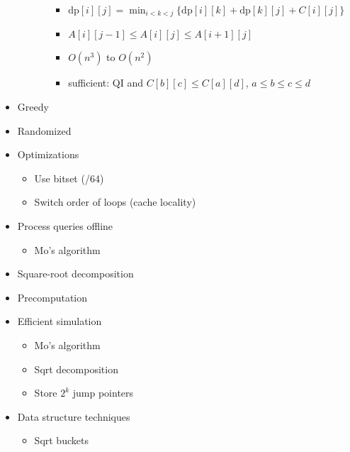 \documentclass[9pt,a4paper,twocolumn,landscape,oneside]{amsart}
\begin{document}
\begin{itemize}
\begin{itemize}
\begin{itemize}
\begin{itemize}
                                        \item $\mathrm{dp}[i][j] = \min_{i<k<j}\{\mathrm{dp}[i][k] + \mathrm{dp}[k][j] + C[i][j]\}$
                                        \item $A[i][j-1] \leq A[i][j] \leq A[i+1][j]$
                                        \item $O(n^3)$ to $O(n^2)$
                                        \item sufficient: QI and $C[b][c] \leq C[a][d]$, $a\leq b\leq c\leq d$
                                    \end{itemize}
                            \end{itemize}
                    \end{itemize}
                \item Greedy
                \item Randomized
                \item Optimizations
                    \begin{itemize}
                        \item Use bitset (/64)
                        \item Switch order of loops (cache locality)
                    \end{itemize}
                \item Process queries offline
                    \begin{itemize}
                        \item Mo's algorithm
                    \end{itemize}
                \item Square-root decomposition
                \item Precomputation
                \item Efficient simulation
                    \begin{itemize}
                        \item Mo's algorithm
                        \item Sqrt decomposition
                        \item Store $2^k$ jump pointers
                    \end{itemize}
                \item Data structure techniques
                    \begin{itemize}
                        \item Sqrt buckets

\end{itemize}
\end{itemize}
\end{document}
